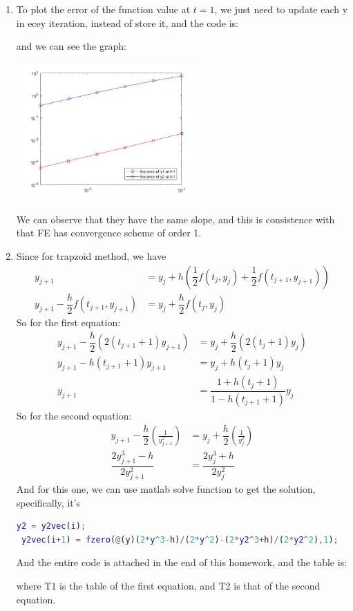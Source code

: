 \documentclass{article}
\begin{document}
\begin{enumerate}
\begin{enumerate}
 \item

To plot the error of the function value at $t=1$, we just need to update each y in ecey iteration, instead of store it, and the code is: 
 
 and we can see the graph:
 \begin{center}
  \includegraphics[width=7cm]{FE_loglog.jpg}  
 \end{center}
 We can observe that they have the same slope, and this is consistence with that FE has convergence scheme of order 1.
 \item
 Since for trapzoid method, we have \begin{align*}
 y_{j+1}&=y_j + h (\dfrac{1}{2} f(t_j,y_j)+\dfrac{1}{2}f(t_{j+1}, y_{j+1}))\\
y_{j+1}-\dfrac{h}{2}f(t_{j+1}, y_{j+1})&=y_j+\dfrac{h}{2}f(t_j,y_j)
 \end{align*}
 So for the first equation: \begin{align*}
 y_{j+1}-\dfrac{h}{2} (2(t_{j+1}+1)y_{j+1})&=y_j+\dfrac{h}{2}(2(t_{j}+1)y_{j})\\
  y_{j+1}-h (t_{j+1}+1)y_{j+1}&=y_j+h(t_{j}+1)y_{j}\\
  y_{j+1}&=\dfrac{1+h(t_{j}+1)}{1-h (t_{j+1}+1)}y_j
 \end{align*}
  So for the second equation: \begin{align*}
 y_{j+1}-\dfrac{h}{2} (\frac{1}{y_{j+1}^2})&=y_j+\dfrac{h}{2}(\frac{1}{y_j^2})\\
 \dfrac{2y_{j+1}^3-h}{2y_{j+1}^2}&=\dfrac{2y_{j}^3+h}{2y_{j}^2}
 \end{align*}
 And for this one, we can use matlab solve function to get the solution, specifically, it's
\begin{lstlisting}[language = Matlab]
 y2 = y2vec(i);
 y2vec(i+1) = fzero(@(y)(2*y^3-h)/(2*y^2)-(2*y2^3+h)/(2*y2^2),1);
\end{lstlisting}
And the entire code is attached in the end of this homework, and the table is: 

where T1 is the table of the first equation, and T2 is that of the second equation.


\end{enumerate}
\end{enumerate}
\end{document}
